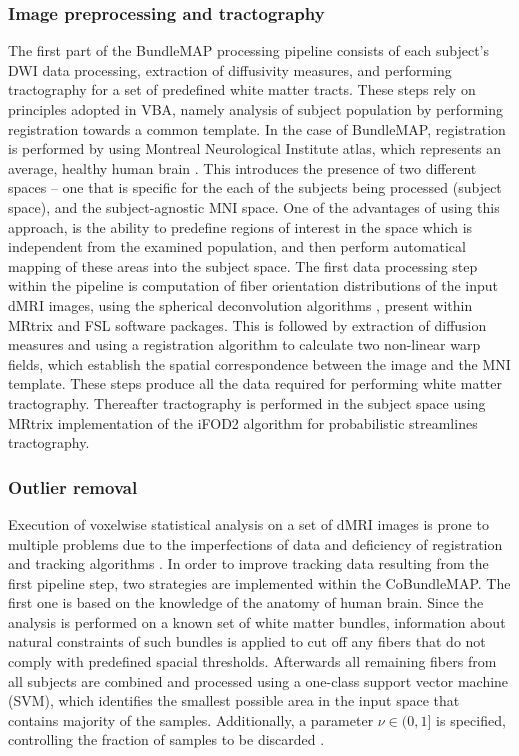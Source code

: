 \documentclass[thesis.tex]{subfiles}
\begin{document}
\subsubsection{Image preprocessing and tractography}
The first part of the BundleMAP processing pipeline consists of each subject's DWI data processing, extraction of diffusivity measures, and performing tractography for a set of predefined white matter tracts. These steps rely on principles adopted in VBA, namely analysis of subject population by performing registration towards a common template. In the case of BundleMAP, registration is performed by using Montreal Neurological Institute atlas, which represents an average, healthy human brain \cite{mniAtlasReference}. This introduces the presence of two different spaces -- one that is specific for the each of the subjects being processed (subject space), and the subject-agnostic MNI space. One of the advantages of using this approach, is the ability to predefine regions of interest in the space which is independent from the examined population, and then perform automatical mapping of these areas into the subject space.
The first data processing step within the pipeline is computation of fiber orientation distributions of the input dMRI images, using the spherical deconvolution algorithms \cite{dwi2fod2-csd, dwi2fod2-msmt-csd}, present within MRtrix \cite{mrtrixGeneral2019} and FSL \cite{fsl1, fsl2} software packages. This is followed by extraction of diffusion measures and using a registration algorithm to calculate two non-linear warp fields, which establish the spatial correspondence between the image and the MNI template. These steps produce all the data required for performing white matter tractography. Thereafter tractography is performed in the subject space using MRtrix \cite{mrtrixGeneral2019} implementation of the iFOD2 algorithm \cite{tckgen} for probabilistic streamlines tractography.

\subsubsection{Outlier removal}
Execution of voxelwise statistical analysis on a set of dMRI images is prone to multiple problems due to the imperfections of data and deficiency of registration and tracking algorithms \cite{voxelwiseImperfections}. In order to improve tracking data resulting from the first pipeline step, two strategies are implemented within the CoBundleMAP. The first one is based on the knowledge of the anatomy of human brain. Since the analysis is performed on a known set of white matter bundles, information about natural constraints of such bundles is applied to cut off any fibers that do not comply with predefined spacial thresholds. Afterwards all remaining fibers from all subjects are combined and processed using a one-class support vector machine (SVM), which identifies the smallest possible area in the input space that contains majority of the samples. Additionally, a parameter $\nu \in (0, 1]$ is specified, controlling the fraction of samples to be discarded \cite{Khatami2017BundleMap}.
\end{document}
